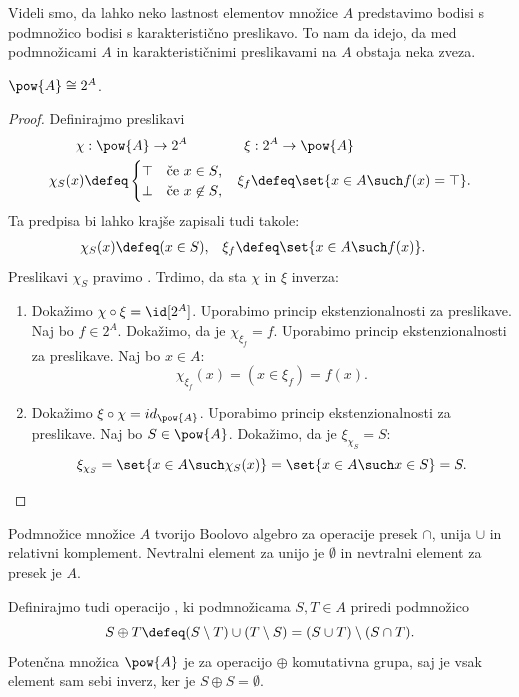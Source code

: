 Videli smo, da lahko neko lastnost elementov množice $A$ predstavimo bodisi s
podmnožico bodisi s karakteristično preslikavo. To nam da idejo, da med
podmnožicami $A$ in karakterističnimi preslikavami na $A$ obstaja neka zveza.

\begin{izrek}
  $\pow{A} \cong 2^A$.
\end{izrek}

\begin{proof}
  Definirajmo preslikavi
  \begin{align*}
    \chi &: \pow{A} \to 2^A &
    \xi &: 2^A \to \pow{A} \\
    \chi_S(x) &\defeq
      \begin{cases}
        \top & \text{če $x \in S$,} \\
        \bot & \text{če $x \not\in S$,}
      \end{cases}
    &
    \xi_f &\defeq \set{x \in A \such f(x) = \top}.
  \end{align*}
  Ta predpisa bi lahko krajše zapisali tudi takole:
  \begin{align*}
  \chi_S(x) &\defeq (x \in S), &
  \xi_f &\defeq \set{x \in A \such f(x) }.
  \end{align*}
  Preslikavi $\chi_S$ pravimo .
  Trdimo, da sta $\chi$ in $\xi$ inverza:
  \begin{enumerate}
  \item 
    Dokažimo $\chi \circ \xi = \id[2^A]$. Uporabimo princip ekstenzionalnosti za preslikave.
    Naj bo $f \in 2^A$. Dokažimo, da je $\chi_{\xi_f} = f$.
    Uporabimo princip ekstenzionalnosti za preslikave. Naj bo $x \in A$:
    \begin{equation*}
      \chi_{\xi_f}(x) = (x \in \xi_f) = f(x).
    \end{equation*}

  \item
    Dokažimo $\xi \circ \chi = id_{\pow{A}}$. Uporabimo princip ekstenzionalnosti za preslikave. Naj bo $S \in \pow{A}$. Dokažimo, da je $\xi_{\chi_S} = S$:
    \begin{equation*}
      \xi_{\chi_S} = \set{x \in A \such \chi_S(x)} = \set{x \in A \such x \in S} = S.
    \end{equation*}
  \end{enumerate}
\end{proof}

Podmnožice množice $A$ tvorijo Boolovo algebro za operacije presek $\cap$, unija $\cup$ in relativni komplement. Nevtralni element za unijo je $\emptyset$ in nevtralni element za presek je $A$.

Definirajmo tudi operacijo , ki podmnožicama $S, T \in A$ priredi podmnožico
%
\begin{equation*}
  S \oplus T \defeq (S \setminus T) \cup (T \setminus S) = (S \cup T) \setminus (S \cap T).
\end{equation*}
%
Potenčna množica $\pow{A}$ je za operacijo $\oplus$ komutativna grupa, saj je vsak element sam sebi inverz, ker je $S \oplus S = \emptyset$.
